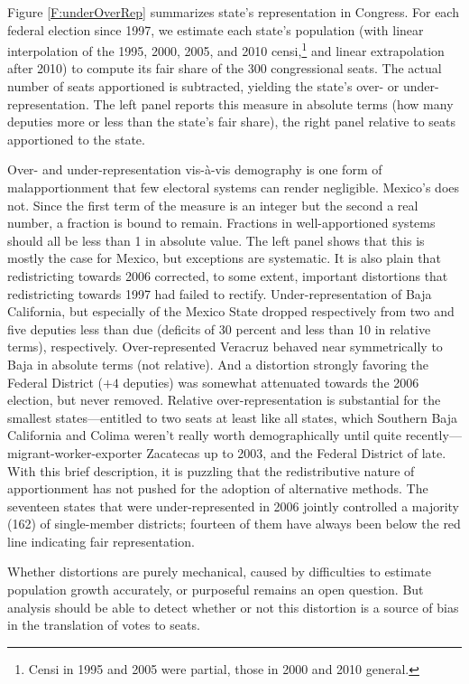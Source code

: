 \documentclass[letter,12pt]{article}
\begin{document}
Figure \ref{F:underOverRep} summarizes state's representation in Congress. For each federal election since 1997, we estimate each state's population (with linear interpolation of the 1995, 2000, 2005, and 2010 censi,\footnote{Censi in 1995 and 2005 were partial, those in 2000 and 2010 general.} and linear extrapolation after 2010) to compute its fair share of the 300 congressional seats. The actual number of seats apportioned is subtracted, yielding the state's over- or under-representation. The left panel reports this measure in absolute terms (how many deputies more or less than the state's fair share), the right panel relative to seats apportioned to the state.  

Over- and under-representation vis-\`a-vis demography is one form of malapportionment that few electoral systems can render negligible. Mexico's does not. Since the first term of the measure is an integer but the second a real number, a fraction is bound to remain. Fractions in well-apportioned systems should all be less than 1 in absolute value. The left panel shows that this is mostly the case for Mexico, but exceptions are systematic. It is also plain that redistricting towards 2006 corrected, to some extent, important distortions that redistricting towards 1997 had failed to rectify. Under-representation of Baja California, but especially of the Mexico State dropped respectively from two and five deputies less than due (deficits of 30 percent and less than 10 in relative terms), respectively. Over-represented Veracruz behaved near symmetrically to Baja in absolute terms (not relative). And a distortion strongly favoring the Federal District ($+4$ deputies) was somewhat attenuated towards the 2006 election, but never removed. Relative over-representation is substantial for the smallest states---entitled to two seats at least like all states, which Southern Baja California and Colima weren't really worth demographically until quite recently---migrant-worker-exporter Zacatecas up to 2003, and the Federal District of late. With this brief description, it is puzzling that the redistributive nature of apportionment has not pushed for the adoption of alternative methods. The seventeen states that were under-represented in 2006 jointly controlled a majority (162) of single-member districts; fourteen of them have always been below the red line indicating fair representation. 

Whether distortions are purely mechanical, caused by difficulties to estimate population growth accurately, or purposeful remains an open question. But analysis should be able to detect whether or not this distortion is a source of bias in the translation of votes to seats. 
\end{document}
